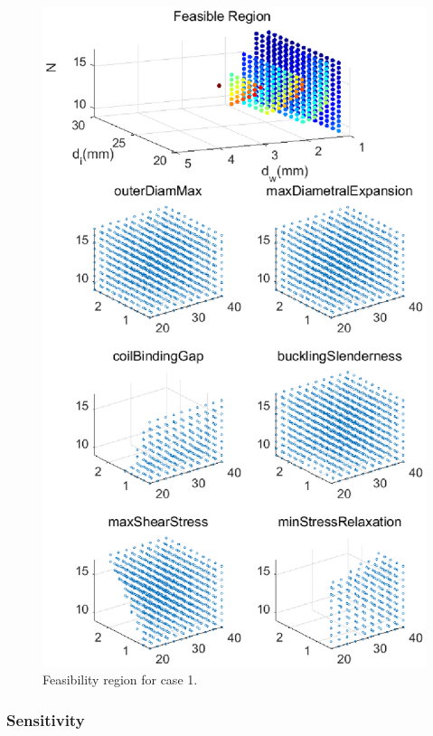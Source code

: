 \documentclass[10pt]{article}
\begin{document}
			\begin{figure}[h!]
		 \begin{center}\includegraphics[scale=.5]{Case_56_34891011new.eps}\end{center}
		 \caption{Feasibility region for case 1.}
		 \label{Feasibility region for case 1.}
		 \end{figure}
		 
\subsubsection{Sensitivity}		
 
\end{document}
